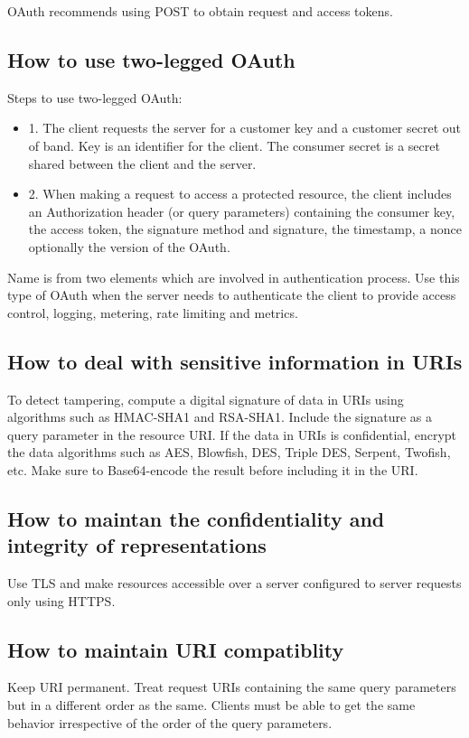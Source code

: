 \documentclass[11pt,a4paper]{article}
\begin{document}
OAuth recommends using POST to obtain request and access tokens.

\subsection{How to use two-legged OAuth}
Steps to use two-legged OAuth:
\begin{itemize}
	\item 1. The client requests the server for a customer key and a customer secret out of band. Key is an identifier for the client. The consumer secret is a secret shared between the client and the server.
	\item 2. When making a request to access a protected resource, the client includes an Authorization header (or query parameters) containing the consumer key, the access token, the signature method and signature, the timestamp, a nonce optionally the version of the OAuth.
\end{itemize}

Name is from two elements which are involved in authentication process. Use this type of OAuth when the server needs to authenticate the client to provide access control, logging, metering, rate limiting and metrics.

\subsection{How to deal with sensitive information in URIs}
To detect tampering, compute a digital signature of data in URIs using algorithms such as HMAC-SHA1 and RSA-SHA1. Include the signature as a query parameter in the resource URI. If the data in URIs is confidential, encrypt the data algorithms such as AES, Blowfish, DES, Triple DES, Serpent, Twofish, etc. Make sure to Base64-encode the result before including it in the URI.

\subsection{How to maintan the confidentiality and integrity of representations}
Use TLS and make resources accessible over a server configured to server requests only using HTTPS.

\subsection{How to maintain URI compatiblity}
Keep URI permanent. Treat request URIs containing the same query parameters but in a different order as the same. Clients must be able to get the same behavior irrespective of the order of the query parameters.
\end{document}
